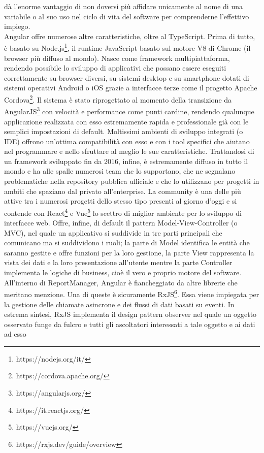 dà l'enorme vantaggio di non doversi più affidare unicamente al nome di una variabile o al suo uso nel ciclo di vita del software per comprenderne l'effettivo impiego.
\\
Angular offre numerose altre caratteristiche, oltre al TypeScript.
Prima di tutto, è basato su Node.js\footnote{https://nodejs.org/it/}, il runtime JavaScript basato sul motore V8 di Chrome (il browser più diffuso al mondo).
Nasce come framework multipiattaforma, rendendo possibile lo sviluppo di applicativi che possano essere eseguiti correttamente su browser diversi, su sistemi desktop e su 
smartphone dotati di sistemi operativi Android o iOS grazie a interfacce terze come il progetto Apache Cordova\footnote{https://cordova.apache.org/}.
Il sistema è stato riprogettato al momento della transizione da AngularJS\footnote{https://angularjs.org/} con velocità e performance come punti cardine, rendendo qualunque 
applicazione realizzata con esso estremamente rapida e professionale già con le semplici impostazioni di default.
Moltissimi ambienti di sviluppo integrati (o IDE) offrono un'ottima compatibilità con esso e con i tool specifici che aiutano nel programmare e nello sfruttare al meglio le sue 
caratteristiche.
Trattandosi di un framework sviluppato fin da 2016, infine, è estremamente diffuso in tutto il mondo e ha alle spalle numerosi team che lo supportano,
che ne segnalano problematiche nella repository pubblica ufficiale e che lo utilizzano per progetti in ambiti che spaziano dal privato all'enterprise.
La community è una delle più attive tra i numerosi progetti dello stesso tipo presenti al giorno d'oggi e si contende con React\footnote{https://it.reactjs.org/} e
Vue\footnote{https://vuejs.org/} lo scettro di miglior ambiente per lo sviluppo di interfacce web.
Offre, infine, di default il pattern Model-View-Controller (o MVC), nel quale un applicativo si suddivide in tre parti principali che comunicano ma si suddividono i ruoli;
la parte di Model identifica le entità che saranno gestite e offre funzioni per la loro gestione, la parte View rappresenta la vista dei dati e la loro presentazione 
all'utente mentre la parte Controller implementa le logiche di business, cioè il vero e proprio motore del software.
\\
All'interno di ReportManager, Angular è fiancheggiato da altre librerie che meritano menzione.
Una di queste è sicuramente RxJS\footnote{https://rxjs.dev/guide/overview}. Essa viene impiegata per la gestione delle chiamate asincrone e dei flussi di dati basati su eventi.
In estrema sintesi, RxJS implementa il design pattern observer nel quale un oggetto osservato funge da fulcro e tutti gli ascoltatori interessati a tale oggetto e ai dati ad esso

